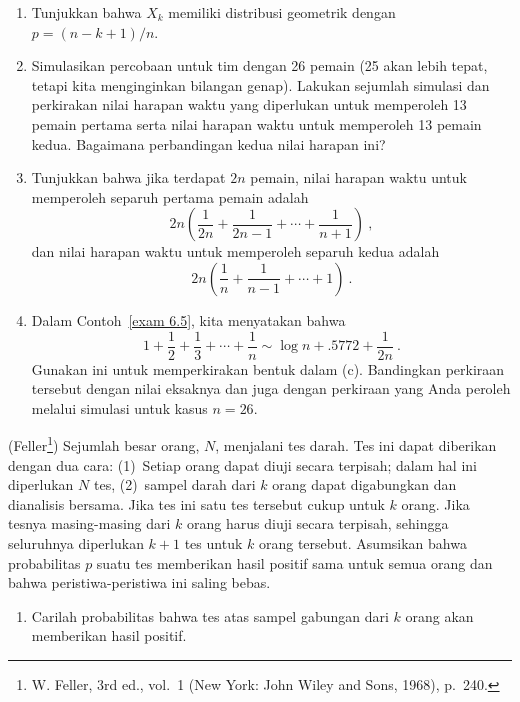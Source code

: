 \begin{LJSItem}
\begin{enumerate}
\item Tunjukkan bahwa $X_k$ memiliki distribusi geometrik dengan $p = (n - k + 1)/n$.

\item Simulasikan percobaan untuk tim dengan 26 pemain (25 akan lebih tepat,
tetapi kita menginginkan bilangan genap). Lakukan sejumlah simulasi dan perkirakan
nilai harapan waktu yang diperlukan untuk memperoleh 13 pemain pertama serta nilai harapan waktu untuk memperoleh
13 pemain kedua. Bagaimana perbandingan kedua nilai harapan ini?

\item Tunjukkan bahwa jika terdapat $2n$ pemain, nilai harapan waktu untuk memperoleh separuh pertama
pemain adalah
$$ 2n \left( \frac 1{2n} + \frac 1{2n - 1} +\cdots+ \frac 1{n + 1} \right)\ ,
$$ dan nilai harapan waktu untuk memperoleh separuh kedua adalah
$$ 2n \left( \frac 1n + \frac 1{n - 1} +\cdots+ 1 \right)\ .
$$

\item Dalam Contoh~\ref{exam 6.5}, kita menyatakan bahwa
$$ 1 + \frac 12 + \frac 13 +\cdots+ \frac 1n \sim \log n + .5772 + \frac 1{2n}\ .
$$ Gunakan ini untuk memperkirakan bentuk dalam (c). Bandingkan perkiraan tersebut dengan
nilai eksaknya dan juga dengan perkiraan yang Anda peroleh melalui simulasi untuk kasus $n =
26$.
\end{enumerate}

\istar\label{exer 6.1.31} (Feller\footnote{W. Feller,   3rd ed., vol.~1 (New York: John Wiley and
Sons, 1968), p.~240.}) Sejumlah besar orang, $N$, menjalani tes
darah. Tes ini dapat diberikan dengan dua cara: (1)~Setiap orang dapat diuji secara terpisah; dalam
hal ini diperlukan $N$ tes, (2)~sampel darah dari $k$ orang dapat digabungkan
dan dianalisis bersama. Jika tes ini  satu tes tersebut cukup untuk
$k$ orang. Jika tesnya  masing-masing dari $k$ orang harus
diuji secara terpisah, sehingga seluruhnya diperlukan $k + 1$ tes untuk $k$ orang tersebut. Asumsikan
bahwa probabilitas $p$ suatu tes memberikan hasil positif sama untuk semua orang dan bahwa
peristiwa-peristiwa ini saling bebas.

\begin{enumerate}
\item Carilah probabilitas bahwa tes atas sampel gabungan dari $k$ orang akan memberikan hasil
positif.


\end{enumerate}
\end{LJSItem}
